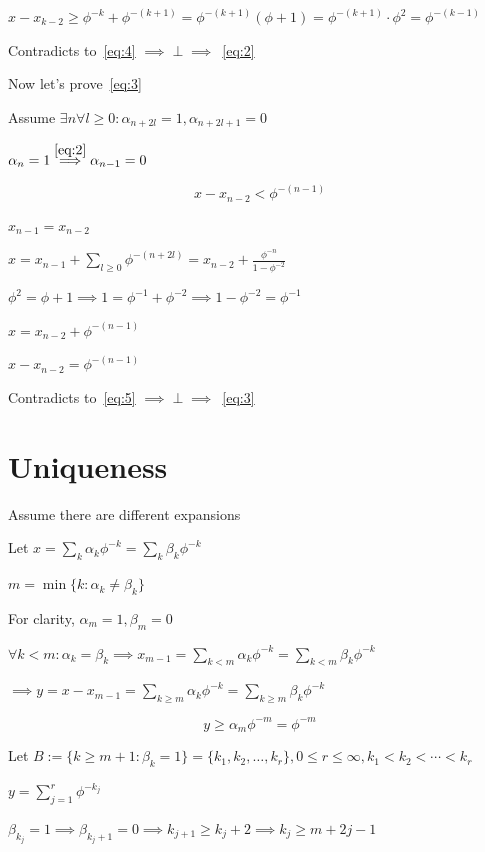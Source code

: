 \documentclass{article}
\begin{document}
\( x - x_{k-2} \geq \phi^{-k} + \phi^{-(k+1)} = \phi^{-(k+1)}(\phi + 1) =  \phi^{-(k+1)} \cdot \phi^{2} = \phi^{-(k-1)} \)

Contradicts to~\eqref{eq:4} \( \implies \perp \implies \)~\eqref{eq:2}

Now let's prove~\eqref{eq:3}

Assume \( \exists n \forall l\geq 0: \alpha_{n+2l} = 1, \alpha_{n+2l + 1} = 0 \)

\( \alpha_{n} = 1 \overset{\eqref{eq:2}}{\implies} \alpha_{n-1} = 0 \)

\[x - x_{n-2} < \phi^{-(n-1)} \tag{5}\label{eq:5}\]

\( x_{n-1} = x_{n-2} \)

\( x = x_{n-1} + \sum_{l \geq 0}\phi^{-(n+2l)} = x_{n-2} + \frac{\phi^{-n}}{1-\phi^{-2}} \)

\( \phi^{2} = \phi + 1 \implies 1 = \phi^{-1} + \phi^{-2} \implies 1 - \phi^{-2} = \phi^{-1} \)

\( x = x_{n-2} + \phi^{-(n-1)} \)

\( x - x_{n-2} = \phi^{-(n-1)} \)

Contradicts to~\eqref{eq:5} \( \implies \perp \implies \)~\eqref{eq:3}

\section*{Uniqueness}

Assume there are different expansions

Let \( x = \sum_{k} \alpha_{k} \phi^{-k} = \sum_{k} \beta_{k} \phi^{-k} \)

\( m = \min \{k: \alpha_{k} \neq \beta_{k} \} \)

For clarity, \( \alpha_{m} = 1, \beta_{m} = 0 \)

\( \forall k<m: \alpha_{k} = \beta_{k} \implies x_{m-1} = \sum_{k<m} \alpha_{k} \phi^{-k} = \sum_{k<m} \beta_{k} \phi^{-k} \)

\( \implies y = x - x_{m-1} = \sum_{k \geq m} \alpha_{k} \phi^{-k} = \sum_{k \geq m} \beta_{k} \phi^{-k} \)

\[y \geq \alpha_{m} \phi^{-m} = \phi^{-m} \tag{6}\label{eq:6}\]

Let \( B := \{ k \geq m + 1: \beta_{k} = 1 \} = \{ k_{1}, k_{2}, \ldots, k_{r} \}, 0 \leq r \leq \infty, k_{1} < k_{2} < \cdots < k_{r} \)

\( y = \sum_{j = 1}^{r} \phi^{-k_{j}} \)

\( \beta_{k_{j}} = 1 \implies \beta_{k_{j}+1} = 0 \implies k_{j+1} \geq k_{j} + 2 \implies k_{j} \geq m + 2j - 1 \)
\end{document}
